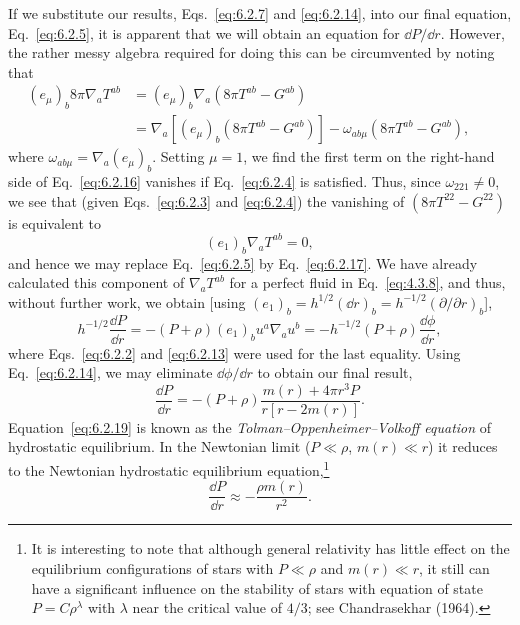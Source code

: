 If we substitute our results, Eqs.~\eqref{eq:6.2.7} and \eqref{eq:6.2.14}, into
our final equation, Eq.~\eqref{eq:6.2.5}, it is apparent that we will obtain an
equation for \(\dd P/\dd r\). However, the rather messy algebra required for doing this
can be circumvented by noting that
\begin{align}
  (e_\mu)_b8\pi\nabla_aT^{ab}
    &=(e_\mu)_b\nabla_a(8\pi T^{ab}-G^{ab})\nonumber\\
    &=\nabla_a\left[(e_\mu)_b(8\pi T^{ab}-G^{ab})\right]
      -\omega_{ab\mu}(8\pi T^{ab}-G^{ab}),
  &&\tag{6.2.16}\label{eq:6.2.16}
\end{align}
where \(\omega_{ab\mu}=\nabla_a(e_\mu)_b\). Setting \(\mu=1\), we find the first
term on the right-hand side of Eq.~\eqref{eq:6.2.16} vanishes if
Eq.~\eqref{eq:6.2.4} is satisfied. Thus, since \(\omega_{221}\ne0\), we see that
(given Eqs.~\eqref{eq:6.2.3} and \eqref{eq:6.2.4}) the vanishing of
\((8\pi T^{22}-G^{22})\) is equivalent to
\begin{equation}
  (e_1)_b\nabla_aT^{ab}=0,
  \tag{6.2.17}\label{eq:6.2.17}
\end{equation}
and hence we may replace Eq.~\eqref{eq:6.2.5} by Eq.~\eqref{eq:6.2.17}. We have
already calculated this component of \(\nabla_aT^{ab}\) for a perfect fluid in
Eq.~\eqref{eq:4.3.8}, and thus, without further work, we obtain [using
\((e_1)_b=h^{1/2}(\dd r)_b=h^{-1/2}(\partial/\partial r)_b\)],
\begin{equation}
  h^{-1/2}\frac{\dd P}{\dd r}
  =-(P+\rho)(e_1)_bu^a\nabla_au^b
  =-h^{-1/2}(P+\rho)\frac{\dd\phi}{\dd r},
  \tag{6.2.18}\label{eq:6.2.18}
\end{equation}
where Eqs.~\eqref{eq:6.2.2} and \eqref{eq:6.2.13} were used for the last
equality. Using Eq.~\eqref{eq:6.2.14}, we may eliminate \(\dd\phi/\dd r\) to obtain
our final result,
\begin{equation}
  \frac{\dd P}{\dd r}=-(P+\rho)\frac{m(r)+4\pi r^3P}{r[r-2m(r)]}.
  \tag{6.2.19}\label{eq:6.2.19}
\end{equation}
Equation~\eqref{eq:6.2.19} is known as the
\emph{Tolman--Oppenheimer--Volkoff equation} of hydrostatic equilibrium. In the
Newtonian limit (\(P\ll\rho\), \(m(r)\ll r\)) it reduces to the Newtonian
hydrostatic equilibrium equation,\footnote{It is interesting to note that
although general relativity has little effect on the equilibrium configurations
of stars with \(P\ll\rho\) and \(m(r)\ll r\), it still can have a significant
influence on the stability of stars with equation of state \(P=C\rho^\lambda\)
with \(\lambda\) near the critical value of \(4/3\); see Chandrasekhar (1964).}
\begin{equation}
  \frac{\dd P}{\dd r}\approx-\frac{\rho m(r)}{r^2}.
  \tag{6.2.20}\label{eq:6.2.20}
\end{equation}

